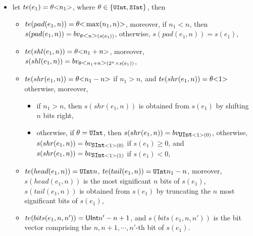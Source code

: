{\begin{itemize}
\begin{itemize}
%
%
\item $te(cvt(e_1)) = \sint{n_1 +1}$ if $\theta = \mbox{\prettyll{UInt}}$, and $te(cvt(e_1)) =  \sint{n_1}$ otherwise,  moreover,
\begin{itemize}
\item if $\theta = \mbox{\prettyll{UInt}}$, then $s(cvt(e_1)) = bv_{\mbox{\prettyll{SInt}}\bwidth{n_1+1}(s(e_1))}$,
%
\item if $\theta = \mbox{\prettyll{SInt}}$, then $s(cvt(e_1)) = s(e_1)$,
\end{itemize}
\end{itemize}
%
\item let $te(e_1) = \theta \mbox{<} n_1 \mbox{>}$, where $\theta \in \{\mbox{\prettyll{UInt}}, \mbox{\prettyll{SInt}}\}$, then
\begin{itemize}
\item $te(pad(e_1, n)) = \theta\mbox{<} \max(n_1, n) \mbox{>}$, moreover, if $n_1 < n$, then $s(pad(e_1,n)) = bv_{\theta\mbox{<} n \mbox{>}(s(e_1))}$, otherwise, $s(pad(e_1,n)) = s(e_1)$,
%
\item $te(shl(e_1,n)) = \theta \mbox{<} n_1 + n \mbox{>}$, moreover, $s(shl(e_1,n)) =  bv_{\theta\mbox{<} n_1 + n \mbox{>}(2^{n} \times s(e_1))}$,
%
\item $te(shr(e_1, n)) = \theta \mbox{<} n_1-n \mbox{>}$ if $n_1 > n$, and $te(shr(e_1, n)) =  \theta \mbox{<} 1 \mbox{>}$ otherwise,  moreover,
\begin{itemize}
\item if $n_1 > n$, then $s(shr(e_1, n))$ is obtained from $s(e_1)$ by shifting $n$ bits right,
%
\item otherwise, if $\theta = \mbox{\prettyll{UInt}}$, then $s(shr(e_1, n))=bv_{\mbox{\prettyll{UInt}}<1>(0)}$, otherwise, $s(shr(e_1, n))=bv_{\mbox{\prettyll{SInt}}<1>(0)}$ if $s(e_1) \ge 0$, and $s(shr(e_1, n))=bv_{\mbox{\prettyll{SInt}}<1>(1)}$ if $s(e_1) < 0$,
\end{itemize}
%
\item $te(head(e_1, n)) = { \mbox{\prettyll{UInt}}}{n}$, $te(tail(e_1, n)) = { \mbox{\prettyll{UInt}}}{n_1-n}$, moreover, $s(head(e_1, n))$ is the most significant $n$ bits of $s(e_1)$, $s(tail(e_1, n))$ is obtained from $s(e_1)$ by truncating the $n$ most significant bits of $s(e_1)$,
%
\item $te(bits(e_1, n, n')) = {\sf UInt}{n'-n+1}$, and $s(bits(e_1, n, n'))$ is the bit vector comprising the $n, n+1, \cdots, n'$-th bit of $s(e_1)$.
\end{itemize}
%
\end{itemize}
}

